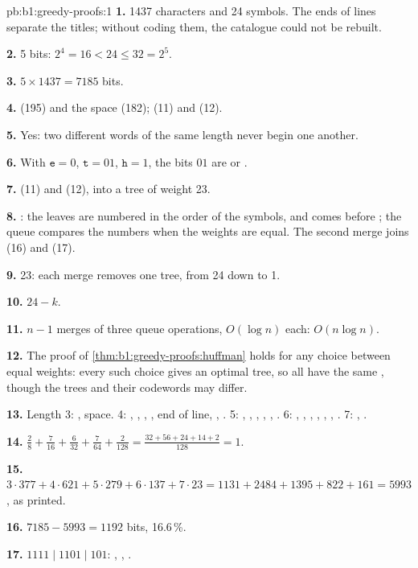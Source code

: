 \begin{solution}{pb:b1:greedy-proofs:1}
\textbf{1.} 1437 characters and 24 symbols. The ends of lines separate the titles; without coding them, the catalogue
could not be rebuilt.

\textbf{2.} 5 bits: $2^4 = 16 < 24 \leq 32 = 2^5$.

\textbf{3.} $5 \times 1437 = 7185$ bits.

\textbf{4.}  (195) and the space (182);  (11) and  (12).

\textbf{5.} Yes: two different words of the same length never begin one another.

\textbf{6.} With $\mathtt{e} = 0$, $\mathtt{t} = 01$, $\mathtt{h} = 1$, the bits $01$ are  or .

\textbf{7.}  (11) and  (12), into a tree of weight 23.

\textbf{8.} : the leaves are numbered in the order of the symbols, and  comes before ; the queue
compares the numbers when the weights are equal. The second merge joins  (16) and  (17).

\textbf{9.} 23: each merge removes one tree, from 24 down to 1.

\textbf{10.} $24 - k$.

\textbf{11.} $n - 1$ merges of three queue operations, $O(\log n)$ each: $O(n \log n)$.

\textbf{12.} The proof of \cref{thm:b1:greedy-proofs:huffman} holds for any choice between equal weights: every such
choice gives an optimal tree, so all have the same , though the trees and their codewords may differ.

\textbf{13.} Length 3: , space. 4: , , , , end of line, , . 5:
, , , , , . 6: , , , , ,
, . 7: , .

\textbf{14.} $\frac{2}{8} + \frac{7}{16} + \frac{6}{32} + \frac{7}{64} + \frac{2}{128} = \frac{32 + 56 + 24 + 14 +
2}{128} = 1$.

\textbf{15.} $3 \cdot 377 + 4 \cdot 621 + 5 \cdot 279 + 6 \cdot 137 + 7 \cdot 23 = 1131 + 2484 + 1395 + 822 + 161 = 5993$,
as printed.

\textbf{16.} $7185 - 5993 = 1192$ bits, 16.6\,\%.

\textbf{17.} $1111 \mid 1101 \mid 101$: , , .


\end{solution}
